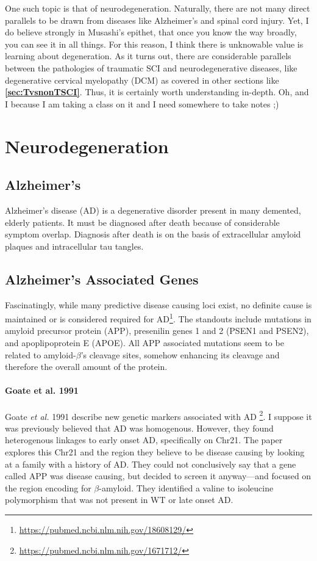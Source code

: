 \documentclass[12pt]{report}
\begin{document}
One such topic is that of neurodegeneration. Naturally, there are not many direct parallels to be drawn from diseases like Alzheimer's and spinal cord injury. Yet, I do believe strongly in Musashi's epithet, that once you know the way broadly, you can see it in all things. For this reason, I think there is unknowable value is learning about degeneration. As it turns out, there are considerable parallels between the pathologies of traumatic SCI and neurodegenerative diseases, like degenerative cervical myelopathy (DCM) as covered in other sections like \textbf{\ref{sec:TvsnonTSCI}}. Thus, it is certainly worth understanding in-depth. Oh, and I because I am taking a class on it and I need somewhere to take notes ;) 

\chapter*{Neurodegeneration}

\section*{Alzheimer's}

Alzheimer's disease (AD) is a degenerative disorder present in many demented, elderly patients. It must be diagnosed after death because of considerable symptom overlap. Diagnosis after death is on the basis of extracellular amyloid plaques and intracellular tau tangles. 

\section*{Alzheimer's Associated Genes}

Fascinatingly, while many predictive disease causing loci exist, no definite cause is maintained or is considered required for AD\footnote{\url{https://pubmed.ncbi.nlm.nih.gov/18608129/}}. The standouts include mutations in amyloid precursor protein (APP), presenilin genes 1 and 2 (PSEN1 and PSEN2), and apoplipoprotein E (APOE). All APP associated mutations seem to be related to amyloid-$\beta$'s cleavage sites, somehow enhancing its cleavage and therefore the overall amount of the protein.\newline

\subsubsection*{Goate et al. 1991}


Goate \textit{et al.} 1991 describe new genetic markers associated with AD \footnote{\url{https://pubmed.ncbi.nlm.nih.gov/1671712/}}. I suppose it was previously believed that AD was homogenous. However, they found heterogenous linkages to early onset AD, specifically on Chr21. The paper explores this Chr21 and the region they believe to be disease causing by looking at a family with a history of AD. They could not conclusively say that a gene called APP was disease causing, but decided to screen it anyway---and focused on the region encoding for $\beta$-amyloid. They identified a valine to isoleucine polymorphism that was not present in WT or late onset AD. 
\end{document}
